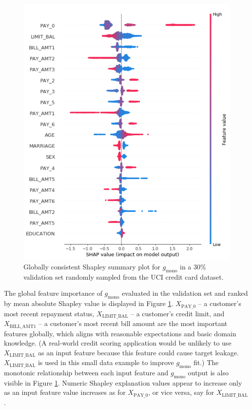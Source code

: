 \documentclass[sigconf]{acmart}
\begin{document}
\begin{figure}[htb]
	\begin{center}
		\includegraphics[scale=0.4]{img/figure_7-eps-converted-to.pdf}
		\caption{Globally consistent Shapley summary plot for $g_{\text{mono}}$ in a 30\% validation set randomly sampled from the UCI credit card dataset.}
		\label{fig:cc_global_shapley}
	\end{center}
\end{figure}

The global feature importance of $g_{\text{mono}}$ evaluated in the validation set and ranked by mean absolute Shapley value is displayed in Figure \ref{fig:cc_global_shapley}. $X_{\text{PAY\_0}}$ -- a customer's most recent repayment status, $X_{\text{LIMIT\_BAL}}$ -- a customer's credit limit, and $X_{\text{BILL\_AMT1}}$ -- a customer's most recent bill amount are the most important features globally, which aligns with reasonable expectations and basic domain knowledge. (A real-world credit scoring application would be unlikely to use $X_{\text{LIMIT\_BAL}}$ as an input feature because this feature could cause target leakage. $X_{\text{LIMIT\_BAL}}$ is used in this small data example to improve $g_{\text{mono}}$ fit.) The monotonic relationship between each input feature and $g_{\text{mono}}$ output is also visible in Figure \ref{fig:cc_global_shapley}. Numeric Shapley explanation values appear to increase only as an input feature value increases as for $X_{\text{PAY\_0}}$, or vice versa, say for $X_{\text{LIMIT\_BAL}}$. 
\end{document}
